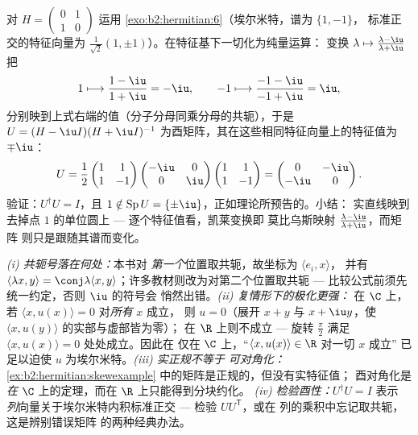 \begin{example}[凯莱变换的计算]\label{ex:b2:hermitian:cayleyrun}
对 $H = \begin{pmatrix} 0 & 1\\
1 & 0\end{pmatrix}$ 运用 \cref{exo:b2:hermitian:6}（埃尔米特，谱为 $\{1, -1\}$，
标准正交的特征向量为 $\frac{1}{\sqrt2}(1, \pm1)$）。在特征基下一切化为纯量运算：
变换 $\lambda
\mapsto \frac{\lambda - \iu}{\lambda + \iu}$ 把
\[
1 \longmapsto \frac{1 - \iu}{1 + \iu} = -\iu,
\qquad
-1 \longmapsto \frac{-1 - \iu}{-1 + \iu} = \iu ,
\]
分别映到上式右端的值（分子分母同乘分母的共轭），于是 $U = (H -
\iu I)(H + \iu I)^{-1}$ 为酉矩阵，其在这些相同特征向量上的特征值为
$\mp\iu$：
\[
U = \frac{1}{2}\begin{pmatrix} 1 & 1\\ 1 & -1\end{pmatrix}
\begin{pmatrix} -\iu & 0\\ 0 & \iu\end{pmatrix}
\begin{pmatrix} 1 & 1\\ 1 & -1\end{pmatrix}
= \begin{pmatrix} 0 & -\iu\\ -\iu & 0\end{pmatrix} .
\]
验证：$U^\dagger U = I$，且 $1 \notin \operatorname{Sp}U =
\{\pm\iu\}$，正如理论所预告的。小结：
实直线映到去掉点 $1$ 的单位圆上 ---
逐个特征值看，凯莱变换即
莫比乌斯映射 $\frac{\lambda-\iu}{\lambda+\iu}$，而矩阵
则只是跟随其谱而变化。
\end{example}

\begin{remark}[常见误区]
\emph{(i) 共轭号落在何处：}本书对
\emph{第一个}位置取共轭，故坐标为 $\langle e_i, x\rangle$，
并有 $\langle\lambda x, y\rangle = \conj\lambda\langle x,
y\rangle$；许多教材则改为对第二个位置取共轭 ---
比较公式前须先统一约定，否则 $\iu$ 的符号会
悄然出错。\emph{(ii) 复情形下的极化更强：}
在 $\C$ 上，若 $\langle x, u(x)\rangle = 0$ 对\emph{所有} $x$ 成立，
则 $u = 0$（展开 $x + y$ 与 $x + \iu y$，使
$\langle x, u(y)\rangle$ 的实部与虚部皆为零）；
在 $\R$ 上则不成立 --- 旋转 $\frac\pi2$ 满足
$\langle x, u(x)\rangle = 0$ 处处成立。因此在
仅在 $\C$ 上，“$\langle x, u(x)\rangle \in \R$ 对一切 $x$ 成立”
已足以迫使 $u$ 为埃尔米特。\emph{(iii) 实正规不等于
可对角化：}
\cref{ex:b2:hermitian:skewexample} 中的矩阵是正规的，但没有实特征值；
酉对角化是\emph{在}
$\C$ 上的定理，而在 $\R$ 上只能得到分块约化。
\emph{(iv) 检验酉性：}$U^\dagger U = I$ 表示
\emph{列}向量关于埃尔米特内积标准正交 ---
检验 $UU^{\mathsf T}$，或在
列的乘积中忘记取共轭，这是辨别错误矩阵
的两种经典办法。
\end{remark}

